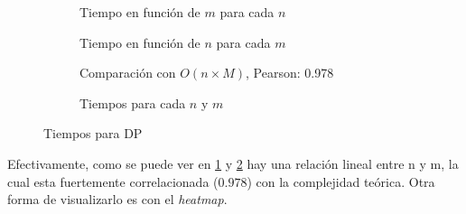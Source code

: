 \begin{figure}[H]
    \centering
    \begin{subfigure}[b]{0.48\textwidth}
        \centering
        
        \caption{Tiempo en función de $m$ para cada $n$}
        \label{fig:comp-dp-nm}
    \end{subfigure}
    \hfill
    \begin{subfigure}[b]{0.48\textwidth}
        \centering
        
        \caption{Tiempo en función de $n$ para cada $m$}
        \label{fig:comp-dp-mn}
    \end{subfigure}
    \hfill
    \begin{subfigure}[b]{0.42\textwidth}
        \centering
        
        \caption{Comparación con $O(n\times M)$, Pearson: 0.978}
    \end{subfigure}
    \hfill
    \begin{subfigure}[b]{0.48\textwidth}
        \centering
        
        \caption{Tiempos para cada $n$ y $m$}
    \end{subfigure}
    \caption{Tiempos para DP}
\end{figure}

Efectivamente, como se puede ver en \ref{fig:comp-dp-nm} y \ref{fig:comp-dp-mn} hay una relación lineal entre n y m, la cual esta fuertemente correlacionada ($0.978$) con la complejidad teórica. Otra forma de visualizarlo es con el \textit{heatmap}.